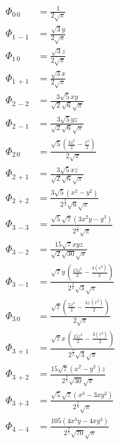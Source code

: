 \documentclass[10pt]{article}
\begin{document}
\begin{align*}
    \Phi_{0\,0} &= \frac{1}{2 \sqrt{\ensuremath{\pi} }} \\
%
    \Phi_{1\, -1} &= \frac{\sqrt{3} y}{2 \sqrt{\ensuremath{\pi} }} \\
    \Phi_{1\,  0} &= \frac{\sqrt{3} z}{2 \sqrt{\ensuremath{\pi} }} \\
    \Phi_{1\, +1} &= \frac{\sqrt{3} x}{2 \sqrt{\ensuremath{\pi} }} \\
%
    \Phi_{2\, -2} &= \frac{3 \sqrt{5} x y}{\sqrt{2} \sqrt{6} \sqrt{\ensuremath{\pi} }} \\
    \Phi_{2\, -1} &= \frac{3 \sqrt{5} y z}{\sqrt{2} \sqrt{6} \sqrt{\ensuremath{\pi} }} \\
    \Phi_{2\, 0} &= \frac{\sqrt{5} \left( \frac{3 {{z}^{2}}}{2}-\frac{r^2}{2}\right) }{2 \sqrt{\ensuremath{\pi} }} \\
    \Phi_{2\, +1} &= \frac{3 \sqrt{5} x z}{\sqrt{2} \sqrt{6} \sqrt{\ensuremath{\pi} }} \\
    \Phi_{2\, +2} &= \frac{3 \sqrt{5} \left( {{x}^{2}}-{{y}^{2}}\right) }{{{2}^{\frac{3}{2}}} \sqrt{6} \sqrt{\ensuremath{\pi} }} \\
%
    \Phi_{3\, -3} &= \frac{\sqrt{5} \sqrt{7} \left( 3 {{x}^{2}} y-{{y}^{3}}\right) }{{{2}^{\frac{5}{2}}} \sqrt{\ensuremath{\pi} }} \\
    \Phi_{3\, -2} &= \frac{15 \sqrt{7} x y z}{\sqrt{2} \sqrt{30} \sqrt{\ensuremath{\pi} }} \\
    \Phi_{3\, -1} &= \frac{\sqrt{7} y\, \left( \frac{15 {{z}^{2}}}{2}-\frac{3 \left( r^2\right) }{2}\right) }{{{2}^{\frac{3}{2}}} \sqrt{3} \sqrt{\ensuremath{\pi} }} \\
    \Phi_{3\, 0} &= \frac{\sqrt{7} \left( \frac{5 {{z}^{3}}}{2}-\frac{3 z\, \left( r^2\right) }{2}\right) }{2 \sqrt{\ensuremath{\pi} }} \\
    \Phi_{3\, +1} &= \frac{\sqrt{7} x\, \left( \frac{15 {{z}^{2}}}{2}-\frac{3 \left( r^2\right) }{2}\right) }{{{2}^{\frac{3}{2}}} \sqrt{3} \sqrt{\ensuremath{\pi} }} \\
    \Phi_{3\, +2} &= \frac{15 \sqrt{7} \left( {{x}^{2}}-{{y}^{2}}\right)  z}{{{2}^{\frac{3}{2}}} \sqrt{30} \sqrt{\ensuremath{\pi} }} \\
    \Phi_{3\, +3} &= \frac{\sqrt{5} \sqrt{7} \left( {{x}^{3}}-3 x {{y}^{2}}\right) }{{{2}^{\frac{5}{2}}} \sqrt{\ensuremath{\pi} }} \\
%
    \Phi_{4\, -4} &= \frac{105 \left( 4 {{x}^{3}} y-4 x {{y}^{3}}\right) }{{{2}^{\frac{7}{2}}} \sqrt{70} \sqrt{\ensuremath{\pi} }} \\

\end{align*}
\end{document}
